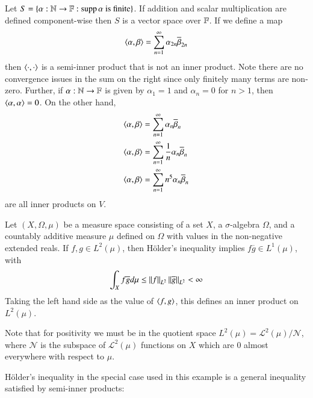 \begin{eg}
    Let $S = \{\alpha:\mathbb N\rightarrow \mathbb F:\operatorname{supp} \alpha \text{ is finite}\}$. If addition and scalar multiplication are defined component-wise then $S$ is a vector space over $\mathbb F$. If we define a map $$\left\langle \alpha, \beta\right\rangle = \sum_{n=1}^{\infty}\alpha_{2n}\overline{\beta}_{2n}$$
    then $\left\langle \cdot, \cdot\right\rangle$ is a semi-inner product that is not an inner product. Note there are no convergence issues in the sum on the right since only finitely many terms are non-zero. Further, if $\alpha:\mathbb N\rightarrow \mathbb F$ is given by $\alpha_1 = 1$ and $\alpha_n = 0$ for $n > 1$, then $\left\langle \alpha, \alpha\right\rangle = 0$. On the other hand, \begin{align*}
        \left\langle \alpha, \beta\right\rangle &= \sum_{n=1}^{\infty}\alpha_n\overline{\beta}_n \\
        \left\langle \alpha, \beta\right\rangle &= \sum_{n=1}^{\infty}\frac{1}{n}\alpha_n\overline{\beta}_n \\
        \left\langle \alpha, \beta\right\rangle &= \sum_{n=1}^{\infty}n^5\alpha_n\overline{\beta}_n 
    \end{align*}
    are all inner products on $V$.
\end{eg}


\begin{eg}
    Let $(X,\Omega,\mu)$ be a measure space consisting of a set $X$, a $\sigma$-algebra $\Omega$, and a countably additive measure $\mu$ defined on $\Omega$ with values in the non-negative extended reals. If $f,g \in L^2(\mu)$, then H\"{o}lder's inequality implies $f\overline{g} \in L^1(\mu)$, with $$\int_Xf\overline{g}d\mu \leq \left|\left| f\right|\right|_{L^2}\left|\left| \overline{g}\right|\right|_{L^2} < \infty$$
    Taking the left hand side as the value of $\left\langle f, g\right\rangle$, this defines an inner product on $L^2(\mu)$.
\end{eg}

Note that for positivity we must be in the quotient space $L^2(\mu) = \mathcal{L}^2(\mu)/\mathcal{N}$, where $\mathcal{N}$ is the subspace of $\mathcal{L}^2(\mu)$ functions on $X$ which are $0$ almost everywhere with respect to $\mu$.

H\"{o}lder's inequality in the special case used in this example is a general inequality satisfied by semi-inner products:

